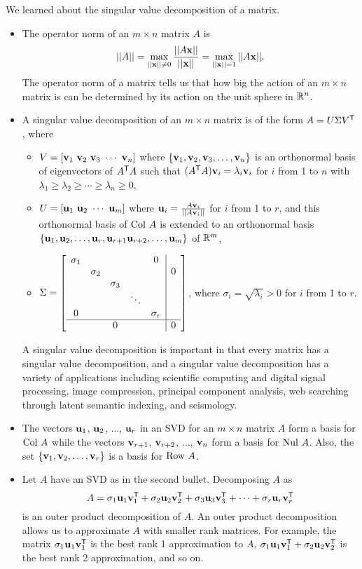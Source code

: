 \label{sec:svd_summ}

We learned about the singular value decomposition of a matrix. 
\begin{itemize}
\item The operator norm of an $m \times n$ matrix $A$ is  
\[||A|| = \max_{||\mathbf{x}|| \neq 0} \frac{||A\mathbf{x}||}{||\mathbf{x}||} = \max_{||\mathbf{x}||=1} ||A\mathbf{x}|| .\]
The operator norm of a matrix tells us that how big the action of an $m \times n$ matrix is can be determined by its action on the unit sphere in $\mathbb{R}^n$. 
\item A singular value decomposition of an $m \times n$ matrix is of the form $A = U \Sigma V^{\mathsf{T}}$, where 
	\begin{itemize}
	\item $V= [\mathbf{v}_1 \ \mathbf{v}_2 \ \mathbf{v}_3 \  \cdots \  \mathbf{v}_n ]$ where $\{\mathbf{v}_1, \mathbf{v}_2, \mathbf{v}_3, \ldots, \mathbf{v}_n\}$ is an  orthonormal basis of eigenvectors of $A^{\mathsf{T}}A$ such that $(A^{\mathsf{T}}A) \mathbf{v}_i = \lambda_i \mathbf{v}_i$ for $i$ from 1 to $n$ with $\lambda_1 \geq \lambda_{2} \geq \cdots \geq \lambda_n \geq 0$,
	\item $U = [\vu_1 \ \vu_2 \ \cdots \ \vu_m]$ where $\mathbf{u}_i = \frac{A\mathbf{v}_i}{||A\mathbf{v}_i||}$ for $i$ from 1 to $r$, and this orthonormal basis of $\text{Col } A$ is extended to an orthonormal basis $\{\mathbf{u}_1, \mathbf{u}_2, \ldots, \mathbf{u}_r, \mathbf{u}_{r+1} \mathbf{u}_{r+2}, \ldots, \mathbf{u}_m\}$ of $\mathbb{R}^m$,
	\item $\Sigma = \left[ \begin{array}{ccccc|c} \sigma_1&&&&0& \\ & \sigma_2&&&&0 \\ && \sigma_3&&& \\ &  & & \ddots & & \\ 0&&&& \sigma_r \\ \hline &&0&&&0 \end{array} \right]$, where $\sigma_i = \sqrt{\lambda_i} > 0$ for $i$ from 1 to $r$. 
	\end{itemize}
A singular value decomposition is important in that every matrix has a singular value decomposition, and a singular value decomposition has a variety of applications including scientific computing and digital signal processing, image compression, principal component analysis, web searching through latent semantic indexing, and seismology. 
\item The vectors $\mathbf{u}_1$, $\mathbf{u}_2$, $\ldots$, $\mathbf{u}_r$ in an SVD for an $m \times n$ matrix $A$ form a basis for $\text{Col } A$ while the vectors $\mathbf{v}_{r+1}$, $\mathbf{v}_{r+2}$, $\ldots$, $\mathbf{v}_n$ form a basis for $\text{Nul } A$.  Also, the set $\{\mathbf{v}_1, \mathbf{v}_2, \ldots, \mathbf{v}_r\}$ is a basis for $\text{Row } A$.
\item Let $A$ have an SVD as in the second bullet. Decomposing $A$ as 
\[A =\sigma_1 \mathbf{u}_1\mathbf{v}_1^{\mathsf{T}} + \sigma_2 \mathbf{u}_2\mathbf{v}_2^{\mathsf{T}} + \sigma_3 \mathbf{u}_3\mathbf{v}_3^{\mathsf{T}} + \cdots + \sigma_r \mathbf{u}_r\mathbf{v}_r^{\mathsf{T}}\] 
is an outer product decomposition of $A$. An outer product decomposition allows us to approximate $A$ with smaller rank matrices. For example, the matrix $\sigma_1 \mathbf{u}_1\mathbf{v}_1^{\mathsf{T}}$ is the best rank 1 approximation to $A$, $\sigma_1 \mathbf{u}_1\mathbf{v}_1^{\mathsf{T}} + \sigma_2 \mathbf{u}_2\mathbf{v}_2^{\mathsf{T}} $ is the best rank 2 approximation, and so on. 

\end{itemize}

